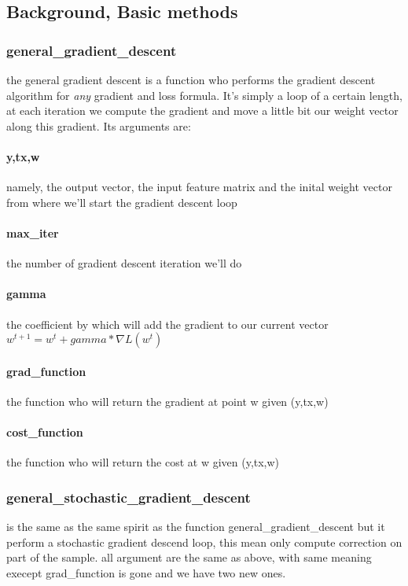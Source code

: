 \documentclass[10pt,conference,compsocconf]{IEEEtran}
\begin{document}
\subsection{Background, Basic methods}
\subsubsection{general\_gradient\_descent}
the general gradient descent is a function who performs the gradient descent algorithm for \emph{any} gradient and loss formula. It's simply a loop of a certain length, at each iteration we compute the gradient and move a little bit our weight vector along this gradient. Its arguments are:
\paragraph{y,tx,w} namely, the output vector, the input feature matrix and
the inital weight vector from where we'll start the gradient descent
loop
\paragraph{max\_iter} the number of gradient descent iteration we'll do
\paragraph{gamma} the coefficient by which will add the gradient to our current
vector \(w^{t+1}=w^{t}+gamma*\nabla L(w^{t})\)
\paragraph{grad\_function} the function who will return the gradient at point
w given (y,tx,w)
\paragraph{cost\_function} the function who will return the cost at w given
(y,tx,w)


\subsubsection{general\_stochastic\_gradient\_descent}
is the same as the same spirit as the function general\_gradient\_descent
but it perform a stochastic gradient descend loop, this mean only compute correction on part of the sample. all argument are the same as above, with same meaning execept grad\_function is gone and we have two new ones.
\end{document}
